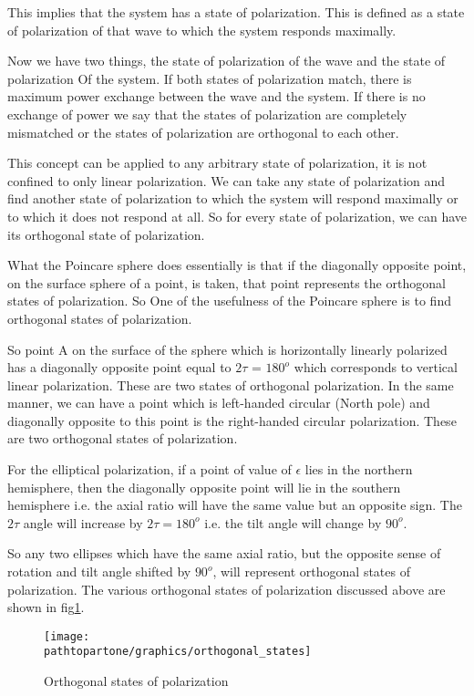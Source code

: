 This implies that the system has a state of polarization. This is defined as a state of polarization of that wave to which the system responds maximally.

Now we have two things, the state of polarization of the wave and the state of polarization Of the system. If both states of polarization match, there is maximum power exchange between the wave and the system. If there is no exchange of power we say that the states of polarization are completely mismatched or the states of polarization are orthogonal to each other.

This concept can be applied to any arbitrary state of polarization, it is not confined to only linear polarization. We can take any state of polarization and find another state of polarization to which the system will respond maximally or to which it does not respond at all. So for every state of polarization, we can have its orthogonal state of polarization. 

What the Poincare sphere does essentially is that if the diagonally opposite point, on the surface sphere of a point, is taken, that point represents the orthogonal states of polarization. So One of the usefulness of the Poincare sphere is to find orthogonal states of polarization.

So point A on the surface of the sphere which is horizontally linearly polarized has a diagonally opposite point equal to $2\tau$ = $180^{o}$ which corresponds to vertical linear polarization. These are two states of orthogonal polarization. In the same manner, we can have a point which is left-handed circular (North pole) and diagonally opposite to this point is the right-handed circular polarization. These are two orthogonal states of polarization.

For the elliptical polarization, if a point of value of $\epsilon$ lies in the northern hemisphere, then the diagonally opposite point will lie in the southern hemisphere i.e. the axial ratio will have the same value but an opposite sign. The $2\tau$ angle will increase by $2\tau = 180^{o}$ i.e. the tilt angle will change by $90^{o}$.

So any two ellipses which have the same axial ratio, but the opposite sense of rotation and tilt angle shifted by $90^{o}$, will represent orthogonal states of polarization. The various orthogonal states of polarization discussed above are shown in fig\ref{fig:orthogonal_states_of_polarization}.

\begin{figure}[h]
\centering
\texttt{[image: \\pathtopartone/graphics/orthogonal\_states]}
\caption{Orthogonal states of polarization}
\label{fig:orthogonal_states_of_polarization}
\end{figure}


